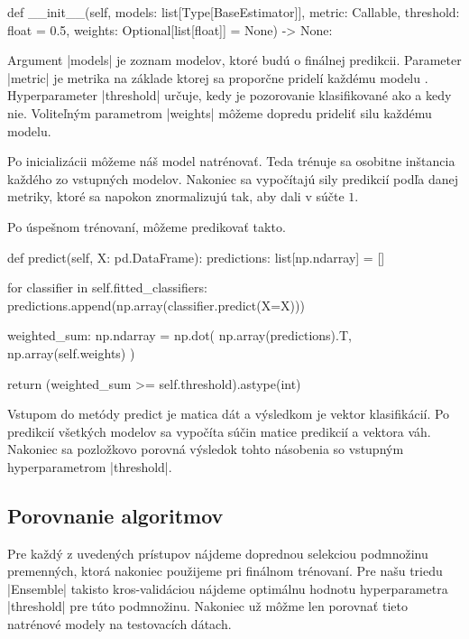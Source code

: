 \documentclass[main.tex]{subfiles}
\begin{document}
\begin{python}
    def __init__(self, models: list[Type[BaseEstimator]],
             metric: Callable, threshold: float = 0.5,
             weights: Optional[list[float]] = None) -> None:
\end{python}
Argument \pyth|models| je zoznam modelov, ktoré budú  o finálnej predikcii. Parameter \pyth|metric| je metrika na základe ktorej sa  proporčne pridelí každému modelu . Hyperparameter \pyth|threshold| určuje, kedy je pozorovanie klasifikované ako  a kedy nie. Voliteľným parametrom \pyth|weights| môžeme dopredu prideliť silu každému modelu.

Po inicializácii môžeme náš  model natrénovať. Teda trénuje sa osobitne inštancia každého zo vstupných modelov. Nakoniec sa vypočítajú sily predikcií podľa danej metriky, ktoré sa napokon znormalizujú tak, aby dali v súčte $1$. 

Po úspešnom trénovaní, môžeme predikovať takto.
\begin{python}
    def predict(self, X: pd.DataFrame):
    predictions: list[np.ndarray] = []

    for classifier in self.fitted_classifiers:
        predictions.append(np.array(classifier.predict(X=X)))
    
    weighted_sum: np.ndarray = np.dot(
    	np.array(predictions).T, np.array(self.weights)
    	)

    return (weighted_sum >= self.threshold).astype(int)
\end{python}
Vstupom do metódy predict je matica dát a výsledkom je vektor klasifikácií. Po predikcií všetkých modelov sa vypočíta súčin matice predikcií a vektora váh. Nakoniec sa pozložkovo porovná výsledok tohto násobenia so vstupným hyperparametrom \pyth|threshold|.

\subsection{Porovnanie algoritmov}

Pre každý z uvedených prístupov nájdeme doprednou selekciou podmnožinu premenných, ktorá nakoniec použijeme pri finálnom trénovaní. Pre našu triedu \pyth|Ensemble| takisto kros-validáciou nájdeme optimálnu hodnotu hyperparametra \pyth|threshold| pre túto podmnožinu. Nakoniec už môžme len porovnať tieto natrénové modely na testovacích dátach.
\end{document}
